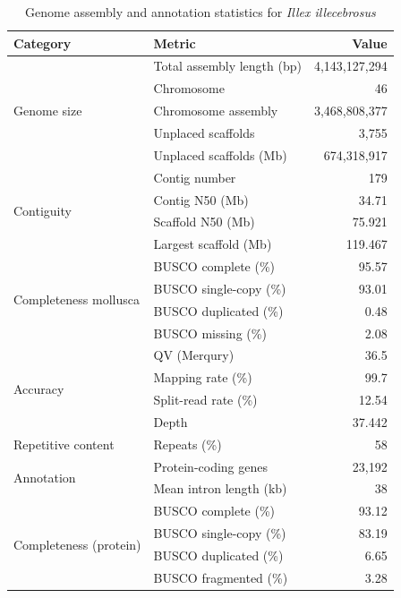 \documentclass[12pt]{article}
\begin{document}
\begin{table}[H]
\centering
\caption{Genome assembly and annotation statistics for \textit{Illex illecebrosus}}
\label{tab:assembly_stats}
\begin{tabular}{llr}
\toprule
\textbf{Category} & \textbf{Metric} & \textbf{Value} \\
\midrule
\multirow{5}{*}{Genome size} & Total assembly length (bp) & 4,143,127,294 \\
 & Chromosome & 46 \\
 & Chromosome assembly & 3,468,808,377 \\
 & Unplaced scaffolds & 3,755 \\
 & Unplaced scaffolds (Mb) & 674,318,917 \\
\midrule
\multirow{4}{*}{Contiguity} & Contig number & 179 \\
 & Contig N50 (Mb) & 34.71 \\
 & Scaffold N50 (Mb) & 75.921 \\
 & Largest scaffold (Mb) & 119.467 \\
\midrule
\multirow{4}{*}{Completeness mollusca} & BUSCO complete (\%) & 95.57 \\
 & BUSCO single-copy (\%) & 93.01 \\
 & BUSCO duplicated (\%) & 0.48 \\
 & BUSCO missing (\%) & 2.08 \\
\midrule
\multirow{4}{*}{Accuracy} & QV (Merqury) & 36.5 \\
 & Mapping rate (\%) & 99.7 \\
 & Split-read rate (\%) & 12.54 \\
 & Depth & 37.442 \\
\midrule
Repetitive content & Repeats (\%) & 58 \\
\midrule
\multirow{2}{*}{Annotation} & Protein-coding genes & 23,192 \\
 & Mean intron length (kb) & 38 \\
\midrule
\multirow{4}{*}{Completeness (protein)} & BUSCO complete (\%) & 93.12 \\
 & BUSCO single-copy (\%) & 83.19 \\
 & BUSCO duplicated (\%) & 6.65 \\
 & BUSCO fragmented (\%) & 3.28 \\
\bottomrule
\end{tabular}
\end{table}
\end{document}
